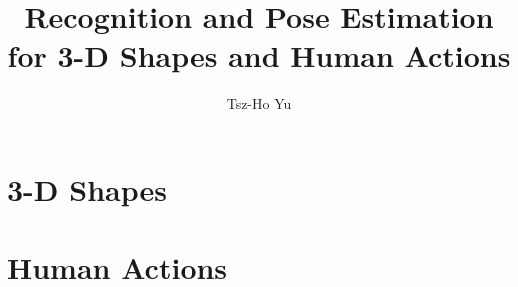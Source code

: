 \documentclass[a4paper, 12pt]{class/thyuthesis}
\title{Recognition and Pose Estimation for 3-D Shapes and Human Actions}
\author{Tsz-Ho Yu}
\begin{document}
\maketitle

\setcounter{secnumdepth}{3}
\setcounter{tocdepth}{3}

\frontmatter
{}




\tableofcontents \newpage
\listoffigures \newpage
\listoftables

\mainmatter



\part{3-D Shapes}





\part{Human Actions}






 

\backmatter
\appendix



\renewcommand{\bibname}{References} 
 
\end{document}
